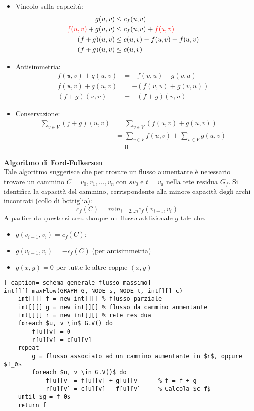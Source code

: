 \documentclass[../cheatSheetAlgoritmi.tex]{subfiles}
\begin{document}
\begin{itemize}
	\item Vincolo sulla capacità:
		\begin{align*}
		g(u, v) & \leq c_f(u, v) \\
		\textcolor{red}{f(u, v)} + g(u, v) & \leq c_f(u, v) + \textcolor{red}{f(u, v)} \\
		(f + g)(u, v) & \leq c(u, v) - f(u, v) + f(u, v) \\
		(f + g)(u, v) & \leq c(u, v)
		\end{align*}
	\item Antisimmetria:
		\begin{align*}
		f(u, v) + g(u, v) & = -f(v, u) - g(v, u) \\
		f(u, v) + g(u, v) & = -(f(v, u) + g(v, u)) \\
		(f+g)(u, v) & = - (f + g)(v, u)
		\end{align*}
	\item Conservazione:
		\begin{align*}
		\sum_{v \in V}(f + g)(u, v) & = 	\sum_{v \in V}(f(u, v) + g(u, v)) \\
		& = \sum_{v \in V}f(u, v) +  \sum_{v \in V}g(u, v)\\
		& = 0
		\end{align*}
\end{itemize}
\textbf{Algoritmo di Ford-Fulkerson} \\
Tale algoritmo suggerisce che per trovare un flusso aumentante è necessario trovare un cammino $C = v_0, v_1, ..., v_n$ con $s  v_0$ e $t = v_n$ nella rete residua $G_f$.
Si identifica la capacità del cammino, corrispondente alla minore capacità degli archi incontrati (collo di bottiglia):
\begin{equation*}
  	c_f(C) = min_{i = 2...n} c_f(v_{i-1}, v_i)
\end{equation*}
A partire da questo si crea dunque un flusso addizionale $g$ tale che:
\begin{itemize}
	\item $g(v_{i-1}, v_i) = c_f(C)$;
	\item $g(v_{i-1}, v_i) = - c_f(C)$ (per antisimmetria)
	\item $g(x, y) = 0$  per tutte le altre coppie $(x, y)$
\end{itemize}
 \begin{lstlisting}[ caption= schema generale flusso massimo]
int[][] maxFlow(GRAPH G, NODE s, NODE t, int[][] c)
	int[][] f = new int[][]	% flusso parziale
	int[][] g = new int[][] % flusso da cammino aumentante
	int[][] r = new int[][] % rete residua
	foreach $u, v \in$ G.V() do
		f[u][v] = 0
		r[u][v] = c[u][v]
	repeat
		g = flusso associato ad un cammino aumentante in $r$, oppure $f_0$
		foreach $u, v \in G.V()$ do
			f[u][v] = f[u][v] + g[u][v] 	% f = f + g
			r[u][v] = c[u][v] - f[u][v] 	% Calcola $c_f$
	until $g = f_0$
	return f
\end{lstlisting}
\end{document}
